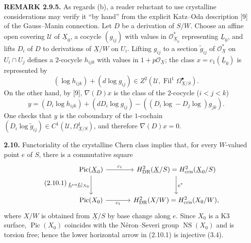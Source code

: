 \documentclass[10pt]{article}
\newcommand{\UX}{\underline{X}}
\newcommand{\UL}{\underline{L}}
\begin{document}
\noindent\textbf{REMARK 2.9.5.} As regards (b), a reader reluctant to use crystalline considerations may verify it ``by hand'' from the explicit Katz--Oda description [9] of the Gauss--Manin connection. Let $D$ be a derivation of $S/W$. Choose an affine open covering $\mathcal U$ of $\UX_0$, a cocycle $(g_{ij})$ with values in $\mathcal O_{\UX_0}^*$ representing $\UL_0$, and lifts $D_i$ of $D$ to derivations of $\UX/W$ on $U_i$. Lifting $g_{ij}$ to a section $\widetilde g_{ij}$ of $\mathcal O_{\UX}^*$ on $U_i\cap U_j$ defines a $2$-cocycle $h_{ijk}$ with values in $1+p\mathcal O_{\UX}$; the class $x=c_1(\UL_0)$ is represented by
\[
(\log h_{ijk})+(d\log g_{ij})\in Z^2(\mathcal U,\operatorname{Fil}^1\Omega^\bullet_{\UX/S}).
\]
On the other hand, by [9], $\nabla(D)x$ is the class of the $2$-cocycle ($i<j<k$)
\[
y=(D_i\log h_{ijk})+(dD_i\log g_{ij})-((D_i\log-D_j\log)g_{jk}).
\]
One checks that $y$ is the coboundary of the $1$-cochain
$(D_i\log\widetilde g_{ij})\in C^1(\mathcal U,\Omega^1_{\UX/S})$, and therefore $\nabla(D)x=0$.

\noindent\textbf{2.10.} Functoriality of the crystalline Chern class implies that, for every $W$-valued point $e$ of $S$, there is a commutative square
\begin{equation}\tag{2.10.1}
\begin{tikzcd}[column sep=large,row sep=large]
\operatorname{Pic}(\UX_0)\arrow[r,"c_1"]\arrow[d,"\UL\mapsto \UL|_{X_0}"']&
H^2_{\mathrm{DR}}(\UX/S)=H^2_{\mathrm{cris}}(\UX_0/S)\arrow[d,"e^*"]\\
\operatorname{Pic}(X_0)\arrow[r,"c_1"']&H^2_{\mathrm{DR}}(X/W)=H^2_{\mathrm{cris}}(X_0/W),
\end{tikzcd}
\end{equation}
where $X/W$ is obtained from $\UX/S$ by base change along $e$. Since $X_0$ is a K3 surface, $\operatorname{Pic}(X_0)$ coincides with the Néron--Severi group $\operatorname{NS}(X_0)$ and is torsion free; hence the lower horizontal arrow in (2.10.1) is injective (3.4).
\newpage
\setcounter{footnote}{0}
\fontsize{10.2pt}{12.04pt}\selectfont
\end{document}
